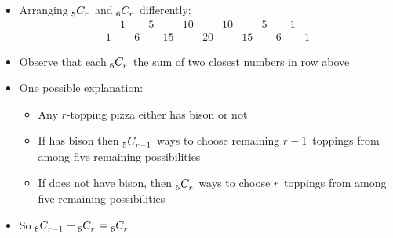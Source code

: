 \documentclass[handout]{beamer}
\theoremstyle{definition}
\newcommand\ncr[2]{\tensor[_{#1}]C{_{#2}}}
\begin{document}
\begin{frame}
\begin{itemize}
\item Arranging $\ncr{5}{r}$ and $\ncr{6}{r}$ differently:
\[\begin{array}{ccccccccccccc}
&1&&5&&10&&10&&5&&1\\
1&&6&&15&&20&&15&&6&&1
\end{array}\]
\item Observe that each $\ncr{6}{r}$ the sum of two closest numbers
in row above
\item One possible explanation:
\begin{itemize}
\item Any $r$-topping pizza either has bison or not
\item If has bison then $\ncr{5}{r-1}$ ways to choose remaining $r-1$~toppings
from among five remaining possibilities
\item If does not have bison, then $\ncr{5}{r}$ ways to choose
$r$~toppings from among five remaining possibilities
\end{itemize}
\item So $\ncr{6}{r-1}+\ncr{6}{r}=\ncr{6}{r}$
\end{itemize}
\end{frame}
\end{document}
